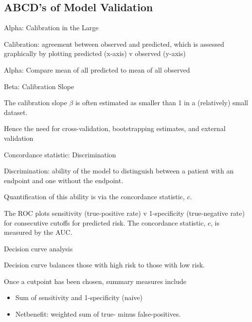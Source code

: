\documentclass[
  12pt,
  ignorenonframetext,
]{beamer}
\providecommand{\tightlist}{%
  \setlength{\itemsep}{0pt}\setlength{\parskip}{0pt}}
\begin{document}
\hypertarget{abcds-of-model-validation-1}{%
\subsection{ABCD's of Model
Validation}\label{abcds-of-model-validation-1}}

\begin{frame}{Alpha: Calibration in the Large}
\protect\hypertarget{alpha-calibration-in-the-large}{}

Calibration: agreement between observed and predicted, which is assessed
graphically by plotting predicted (x-axis) v observed (y-axis)

Alpha: Compare mean of all predicted to mean of all observed

\end{frame}

\begin{frame}{Beta: Calibration Slope}
\protect\hypertarget{beta-calibration-slope}{}

The calibration slope \(\beta\) is often estimated as smaller than 1 in
a (relatively) small dataset.

Hence the need for cross-validation, bootstrapping estimates, and
external validation

\end{frame}

\begin{frame}{Concordance statistic: Discrimination}
\protect\hypertarget{concordance-statistic-discrimination}{}

Discrimination: ability of the model to distinguish between a patient
with an endpoint and one without the endpoint.

Quantification of this ability is via the concordance statistic, \(c\).

The ROC plots sensitivity (true-positive rate) v 1-specificity
(true-negative rate) for consecutive cutoffs for predicted risk. The
concordance statistic, \(c\), is measured by the AUC.

\end{frame}

\begin{frame}{Decision curve analysis}
\protect\hypertarget{decision-curve-analysis}{}

Decision curve balances those with high risk to those with low risk.

Once a cutpoint has been chosen, summary measures include

\begin{itemize}[<+->]
\tightlist
\item
  Sum of sensitivity and 1-specificity (naive)
\item
  Netbenefit: weighted sum of true- minus false-positives.
\end{itemize}

\end{frame}
\end{document}
